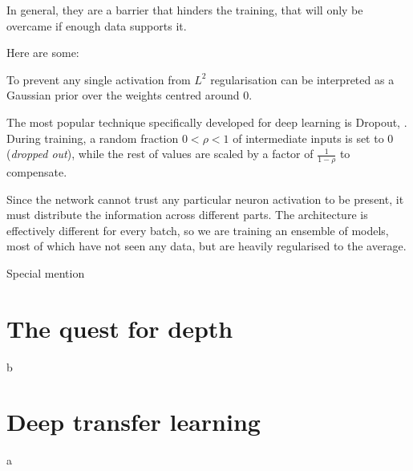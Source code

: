 In general, they are a barrier that hinders the training, that will only be overcame if enough data supports it.

Here are some:

To prevent any single activation from
$L^2$ regularisation can be interpreted as a Gaussian prior over the weights centred around $0$.

The most popular technique  
specifically developed for deep learning is Dropout, \citep{dropout}. 
During training, a random fraction $0 < \rho < 1$ of intermediate inputs is set to $0$ (\emph{dropped out}), while the rest of values are scaled by a factor of $\frac{1}{1-\rho}$ to compensate.

Since the network cannot trust any particular neuron activation to be present, it must distribute the information across different parts.
The architecture is effectively different for every batch, so we are training an ensemble of models, most of which have not seen any data, but are heavily regularised to the average.


Special mention


\section{The quest for depth}
b
\section{Deep transfer learning}
a


